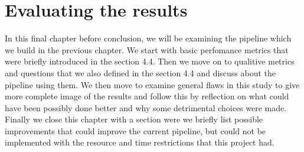 \chapter{Evaluating the results}
\label{chapter:evaluation}





In this final chapter before conclusion, we will be examining the pipeline which we build in the previous chapter.
We start with basic perfomance metrics that were briefly introduced in the section 4.4.
Then we move on to qualitive metrics and questions that we also defined in the section 4.4 and discuss about the pipeline using them.
We then move to examine general flaws in this study to give more complete image of the results and follow this by reflection on what could have been possibly done better and why some detrimental choices were made. 
Finally we close this chapter with a section were we briefly list possible improvements that could improve the current pipeline, but could not be implemented with the resource and time restrictions that this project had.

